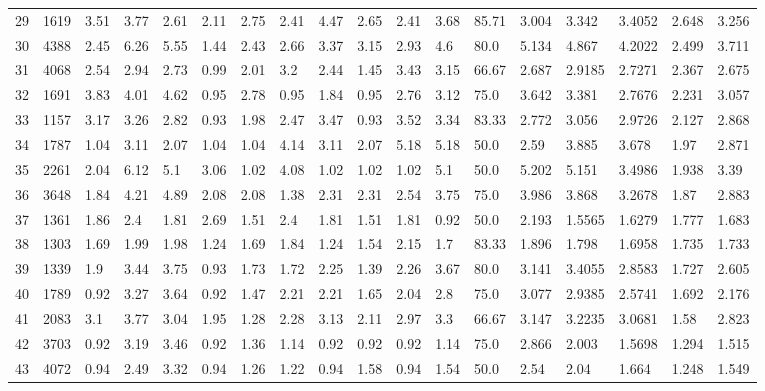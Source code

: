\documentclass[landscape, 10pt]{report}
\begin{document}
\begin{longtable}{l || l || l | l | l | l | l | l | l | l | l | l | l || l | l | l | l | l}
\rowcolor{lightgray}29 & 1619 & 3.51 & 3.77 & 2.61 & 2.11 & 2.75 & 2.41 & 4.47 & 2.65 & 2.41 & 3.68 & 85.71 & 3.004 & 3.342 & 3.4052 & 2.648 & 3.256\\ 
30 & 4388 & 2.45 & 6.26 & 5.55 & 1.44 & 2.43 & 2.66 & 3.37 & 3.15 & 2.93 & 4.6 & 80.0 & 5.134 & 4.867 & 4.2022 & 2.499 & 3.711\\ 
\rowcolor{lightgray}31 & 4068 & 2.54 & 2.94 & 2.73 & 0.99 & 2.01 & 3.2 & 2.44 & 1.45 & 3.43 & 3.15 & 66.67 & 2.687 & 2.9185 & 2.7271 & 2.367 & 2.675\\ 
32 & 1691 & 3.83 & 4.01 & 4.62 & 0.95 & 2.78 & 0.95 & 1.84 & 0.95 & 2.76 & 3.12 & 75.0 & 3.642 & 3.381 & 2.7676 & 2.231 & 3.057\\ 
\rowcolor{lightgray}33 & 1157 & 3.17 & 3.26 & 2.82 & 0.93 & 1.98 & 2.47 & 3.47 & 0.93 & 3.52 & 3.34 & 83.33 & 2.772 & 3.056 & 2.9726 & 2.127 & 2.868\\ 
34 & 1787 & 1.04 & 3.11 & 2.07 & 1.04 & 1.04 & 4.14 & 3.11 & 2.07 & 5.18 & 5.18 & 50.0 & 2.59 & 3.885 & 3.678 & 1.97 & 2.871\\ 
\rowcolor{lightgray}35 & 2261 & 2.04 & 6.12 & 5.1 & 3.06 & 1.02 & 4.08 & 1.02 & 1.02 & 1.02 & 5.1 & 50.0 & 5.202 & 5.151 & 3.4986 & 1.938 & 3.39\\ 
36 & 3648 & 1.84 & 4.21 & 4.89 & 2.08 & 2.08 & 1.38 & 2.31 & 2.31 & 2.54 & 3.75 & 75.0 & 3.986 & 3.868 & 3.2678 & 1.87 & 2.883\\ 
\rowcolor{lightgray}37 & 1361 & 1.86 & 2.4 & 1.81 & 2.69 & 1.51 & 2.4 & 1.81 & 1.51 & 1.81 & 0.92 & 50.0 & 2.193 & 1.5565 & 1.6279 & 1.777 & 1.683\\ 
38 & 1303 & 1.69 & 1.99 & 1.98 & 1.24 & 1.69 & 1.84 & 1.24 & 1.54 & 2.15 & 1.7 & 83.33 & 1.896 & 1.798 & 1.6958 & 1.735 & 1.733\\ 
\rowcolor{lightgray}39 & 1339 & 1.9 & 3.44 & 3.75 & 0.93 & 1.73 & 1.72 & 2.25 & 1.39 & 2.26 & 3.67 & 80.0 & 3.141 & 3.4055 & 2.8583 & 1.727 & 2.605\\ 
40 & 1789 & 0.92 & 3.27 & 3.64 & 0.92 & 1.47 & 2.21 & 2.21 & 1.65 & 2.04 & 2.8 & 75.0 & 3.077 & 2.9385 & 2.5741 & 1.692 & 2.176\\ 
\rowcolor{lightgray}41 & 2083 & 3.1 & 3.77 & 3.04 & 1.95 & 1.28 & 2.28 & 3.13 & 2.11 & 2.97 & 3.3 & 66.67 & 3.147 & 3.2235 & 3.0681 & 1.58 & 2.823\\ 
42 & 3703 & 0.92 & 3.19 & 3.46 & 0.92 & 1.36 & 1.14 & 0.92 & 0.92 & 0.92 & 1.14 & 75.0 & 2.866 & 2.003 & 1.5698 & 1.294 & 1.515\\ 
\rowcolor{lightgray}43 & 4072 & 0.94 & 2.49 & 3.32 & 0.94 & 1.26 & 1.22 & 0.94 & 1.58 & 0.94 & 1.54 & 50.0 & 2.54 & 2.04 & 1.664 & 1.248 & 1.549\\ 

\end{longtable}
\end{document}
